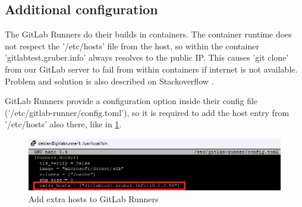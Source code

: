 \subsection{Additional configuration}

The GitLab Runners do their builds in containers.
The container runtime does not respect the '/etc/hosts' file from the host, so within the container 'gitlabtest.gruber.info' always resolves to the public IP.
This causes 'git clone' from our GitLab server to fail from within containers if internet is not available.
Problem and solution is also described on Stackoverflow \cite{refGitlabRunnerHostsFile}.

GitLab Runners provide a configuration option inside their config file ('/etc/gitlab-runner/config.toml'), so it is required to add the host entry from '/etc/hosts' also there, like in \ref{fig:gitlab_runner_extra_hosts}.


\begin{figure}[H]
	\centering
	\includegraphics[width=14cm]{images/gitlab_runner_extra_hosts.png}
	\caption{Add extra hosts to GitLab Runners}
	\label{fig:gitlab_runner_extra_hosts}
\end{figure}
